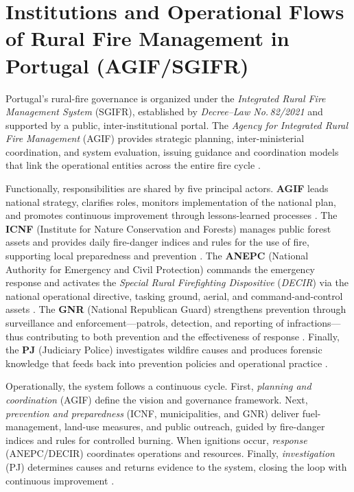 \chapter{Institutions and Operational Flows of Rural Fire Management in Portugal (AGIF/SGIFR)}
\label{appendix-agif_pt_fire_combat_system_en}

Portugal’s rural-fire governance is organized under the \emph{Integrated Rural Fire Management System} (SGIFR), established by \emph{Decree–Law No.\,82/2021} and supported by a public, inter-institutional portal. The \emph{Agency for Integrated Rural Fire Management} (AGIF) provides strategic planning, inter-ministerial coordination, and system evaluation, issuing guidance and coordination models that link the operational entities across the entire fire cycle \cite{DL82-2021,SGIFR-Portal,AGIF-SGIFR,SGIFR-Leg}.

Functionally, responsibilities are shared by five principal actors. \textbf{AGIF} leads national strategy, clarifies roles, monitors implementation of the national plan, and promotes continuous improvement through lessons-learned processes \cite{AGIF-SGIFR,SGIFR-Portal}. The \textbf{ICNF} (Institute for Nature Conservation and Forests) manages public forest assets and provides daily fire-danger indices and rules for the use of fire, supporting local preparedness and prevention \cite{ICNF-Risco,ICNF-PIR,IPMA-PIR}. The \textbf{ANEPC} (National Authority for Emergency and Civil Protection) commands the emergency response and activates the \emph{Special Rural Firefighting Dispositive} (\emph{DECIR}) via the national operational directive, tasking ground, aerial, and command-and-control assets \cite{ANEPC-DECIR-2025,ANEPC-site}. The \textbf{GNR} (National Republican Guard) strengthens prevention through surveillance and enforcement—patrols, detection, and reporting of infractions—thus contributing to both prevention and the effectiveness of response \cite{GNR-noticias}. Finally, the \textbf{PJ} (Judiciary Police) investigates wildfire causes and produces forensic knowledge that feeds back into prevention policies and operational practice \cite{PJ-incendio}.

Operationally, the system follows a continuous cycle. First, \emph{planning and coordination} (AGIF) define the vision and governance framework. Next, \emph{prevention and preparedness} (ICNF, municipalities, and GNR) deliver fuel-management, land-use measures, and public outreach, guided by fire-danger indices and rules for controlled burning. When ignitions occur, \emph{response} (ANEPC/DECIR) coordinates operations and resources. Finally, \emph{investigation} (PJ) determines causes and returns evidence to the system, closing the loop with continuous improvement \cite{DL82-2021,AGIF-SGIFR,ICNF-Risco,ANEPC-DECIR-2025,PJ-incendio}.

